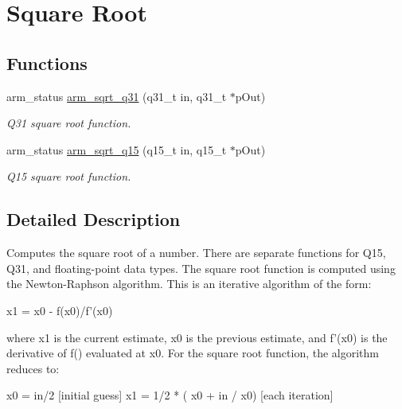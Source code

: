 \hypertarget{group___s_q_r_t}{\section{Square Root}
\label{group___s_q_r_t}
}
\subsection*{Functions}
\begin{DoxyCompactItemize}
\item 
arm\-\_\-status \hyperlink{group___s_q_r_t_ga119e25831e141d734d7ef10636670058}{arm\-\_\-sqrt\-\_\-q31} (q31\-\_\-t in, q31\-\_\-t $\ast$p\-Out)
\begin{DoxyCompactList}\small\item\em Q31 square root function. \end{DoxyCompactList}\item 
arm\-\_\-status \hyperlink{group___s_q_r_t_ga5abe5ca724f3e15849662b03752c1238}{arm\-\_\-sqrt\-\_\-q15} (q15\-\_\-t in, q15\-\_\-t $\ast$p\-Out)
\begin{DoxyCompactList}\small\item\em Q15 square root function. \end{DoxyCompactList}\end{DoxyCompactItemize}


\subsection{Detailed Description}
Computes the square root of a number. There are separate functions for Q15, Q31, and floating-\/point data types. The square root function is computed using the Newton-\/\-Raphson algorithm. This is an iterative algorithm of the form\-: 
\begin{DoxyPre}
     x1 = x0 - f(x0)/f'(x0)
\end{DoxyPre}
 where {\ttfamily x1} is the current estimate, {\ttfamily x0} is the previous estimate, and {\ttfamily f'(x0)} is the derivative of {\ttfamily f()} evaluated at {\ttfamily x0}. For the square root function, the algorithm reduces to\-: 
\begin{DoxyPre}
    x0 = in/2                         [initial guess]
    x1 = 1/2 * ( x0 + in / x0)        [each iteration]
\end{DoxyPre}
 

